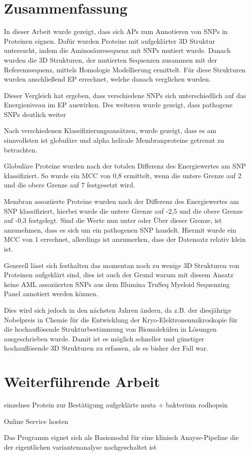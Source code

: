 \section{Zusammenfassung}



In dieser Arbeit wurde gezeigt, dass sich \acf{APs} zum Annotieren von \acf{SNP}s in Proteinen eignen. Dafür wurden Proteine mit aufgeklärter 3D Struktur untersucht, indem die Aminosäuresequenz mit \ac{SNP}s mutiert wurde. Danach wurden die 3D Strukturen, der mutierten Sequenzen zusammen mit der Referenzsequenz, mittels Homologie Modellierung ermittelt. Für diese Strukturen wurden anschließend \acf{EP} errechnet, welche danach verglichen wurden.

Dieser Vergleich hat ergeben, dass verschiedene \ac{SNP}s sich unterschiedlich auf das Energieniveau im \ac{EP} auswirken. Des weiteren wurde gezeigt, dass pathogene \ac{SNP}s deutlich weiter 

Nach verschiedenen Klassifizierungsansätzen, wurde gezeigt, dass es am sinnvollsten ist globuläre und alpha helicale Membranproteine getrennt zu betrachten. 

Globuläre Proteine wurden nach der totalen Differenz des Energiewertes am \ac{SNP} klassifiziert. So wurde ein MCC von 0,8 ermittelt, wenn die untere Grenze auf 2 und die obere Grenze auf 7 festgesetzt wird. 

Membran assoziierte Proteine wurden nach der Differenz des Energiewertes am \ac{SNP} klassifiziert, hierbei wurde die untere Grenze auf -2,5 und die obere Grenze auf -0,3 festgelegt. Sind die Werte nun unter oder Über dieser Grenze, ist anzunehmen, dass es sich um ein pathogenen \ac{SNP} handelt. Hiermit wurde ein MCC von 1 errechnet, allerdings ist anzumerken, dass der Datensatz relativ klein ist.

Generell lässt sich festhalten das momentan noch zu wenige 3D Strukturen von Proteinen aufgeklärt sind, dies ist auch der Grund warum mit diesem Ansatz keine \ac{AML} assoziierten \ac{SNP}s aus dem Illumina TruSeq Myeloid Sequenzing Panel annotiert werden können.

Dies wird sich jedoch in den nächsten Jahren ändern, da z.B. der diesjährige Nobelpreis in Chemie für die Entwicklung der Kryo-Elektronenmikroskopie für die hochauflösende Strukturbestimmung von Biomolekülen in Lösungen ausgeschrieben wurde. Damit ist es möglich schneller und günstiger hochauflösende 3D Strukturen zu erfassen, als es bisher der Fall war.



\section{Weiterführende Arbeit}

einzelnes Protein zur Bestätigung
aufgeklärte muta + bakterium rodhopsin

Online Service hosten


Das Programm eignet sich als Basismodul für eine klinisch Anayse-Pipeline die der eigentlichen variantenanalyse nachgeschaltet ist